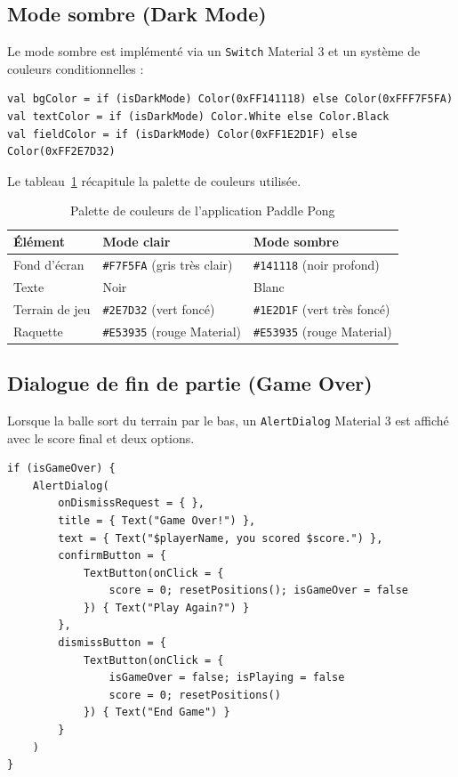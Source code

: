 \documentclass[12pt,a4paper]{report}
\begin{document}
\subsection{Mode sombre (Dark Mode)}
Le mode sombre est impl\'ement\'e via un \texttt{Switch} Material 3 et un syst\`eme de couleurs conditionnelles :

\begin{lstlisting}[caption={Impl\'ementation du mode sombre par palette conditionnelle}, label=lst:darkmode]
val bgColor = if (isDarkMode) Color(0xFF141118) else Color(0xFFF7F5FA)
val textColor = if (isDarkMode) Color.White else Color.Black
val fieldColor = if (isDarkMode) Color(0xFF1E2D1F) else Color(0xFF2E7D32)
\end{lstlisting}

Le tableau~\ref{tab:colors} r\'ecapitule la palette de couleurs utilis\'ee.

\begin{table}[H]
\centering
\caption{Palette de couleurs de l'application Paddle Pong}
\label{tab:colors}
\begin{tabularx}{\textwidth}{lXX}
\toprule
\textbf{\'El\'ement} & \textbf{Mode clair} & \textbf{Mode sombre} \\
\midrule
Fond d'\'ecran & \texttt{\#F7F5FA} (gris tr\`es clair) & \texttt{\#141118} (noir profond) \\
Texte & Noir & Blanc \\
Terrain de jeu & \texttt{\#2E7D32} (vert fonc\'e) & \texttt{\#1E2D1F} (vert tr\`es fonc\'e) \\
Raquette & \texttt{\#E53935} (rouge Material) & \texttt{\#E53935} (rouge Material) \\
\bottomrule
\end{tabularx}
\end{table}

\subsection{Dialogue de fin de partie (Game Over)}
Lorsque la balle sort du terrain par le bas, un \texttt{AlertDialog} Material 3 est affich\'e avec le score final et deux options.

\begin{lstlisting}[caption={Dialogue de fin de partie avec options de replay}, label=lst:gameover]
if (isGameOver) {
    AlertDialog(
        onDismissRequest = { },
        title = { Text("Game Over!") },
        text = { Text("$playerName, you scored $score.") },
        confirmButton = {
            TextButton(onClick = {
                score = 0; resetPositions(); isGameOver = false
            }) { Text("Play Again?") }
        },
        dismissButton = {
            TextButton(onClick = {
                isGameOver = false; isPlaying = false
                score = 0; resetPositions()
            }) { Text("End Game") }
        }
    )
}
\end{lstlisting}
\end{document}

